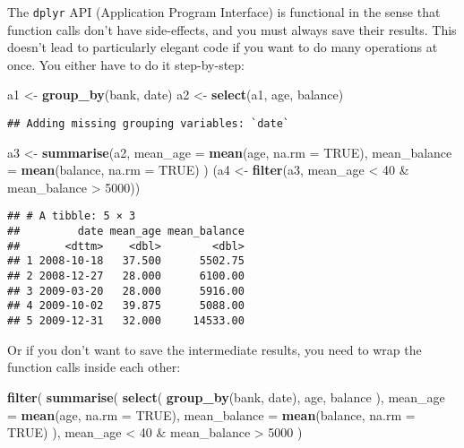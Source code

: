 \documentclass[]{book}
\newenvironment{Shaded}{\begin{snugshade}}{\end{snugshade}}
\newcommand{\KeywordTok}[1]{\textcolor[rgb]{0.13,0.29,0.53}{\textbf{{#1}}}}
\newcommand{\DataTypeTok}[1]{\textcolor[rgb]{0.13,0.29,0.53}{{#1}}}
\newcommand{\DecValTok}[1]{\textcolor[rgb]{0.00,0.00,0.81}{{#1}}}
\newcommand{\StringTok}[1]{\textcolor[rgb]{0.31,0.60,0.02}{{#1}}}
\newcommand{\OtherTok}[1]{\textcolor[rgb]{0.56,0.35,0.01}{{#1}}}
\newcommand{\NormalTok}[1]{{#1}}
\begin{document}
The \texttt{dplyr} API (Application Program Interface) is functional in
the sense that function calls don't have side-effects, and you must
always save their results. This doesn't lead to particularly elegant
code if you want to do many operations at once. You either have to do it
step-by-step:

\begin{Shaded}
\begin{Highlighting}[]
\NormalTok{a1 <-}\StringTok{ }\KeywordTok{group_by}\NormalTok{(bank, date)}
\NormalTok{a2 <-}\StringTok{ }\KeywordTok{select}\NormalTok{(a1, age, balance)}
\end{Highlighting}
\end{Shaded}

\begin{verbatim}
## Adding missing grouping variables: `date`
\end{verbatim}

\begin{Shaded}
\begin{Highlighting}[]
\NormalTok{a3 <-}\StringTok{ }\KeywordTok{summarise}\NormalTok{(a2,}
                \DataTypeTok{mean_age =} \KeywordTok{mean}\NormalTok{(age, }\DataTypeTok{na.rm =} \OtherTok{TRUE}\NormalTok{),}
                \DataTypeTok{mean_balance =} \KeywordTok{mean}\NormalTok{(balance, }\DataTypeTok{na.rm =} \OtherTok{TRUE}\NormalTok{)}
                \NormalTok{)}
\NormalTok{(a4 <-}\StringTok{ }\KeywordTok{filter}\NormalTok{(a3, mean_age <}\StringTok{ }\DecValTok{40} \NormalTok{&}\StringTok{ }\NormalTok{mean_balance >}\StringTok{ }\DecValTok{5000}\NormalTok{))}
\end{Highlighting}
\end{Shaded}

\begin{verbatim}
## # A tibble: 5 × 3
##         date mean_age mean_balance
##       <dttm>    <dbl>        <dbl>
## 1 2008-10-18   37.500      5502.75
## 2 2008-12-27   28.000      6100.00
## 3 2009-03-20   28.000      5916.00
## 4 2009-10-02   39.875      5088.00
## 5 2009-12-31   32.000     14533.00
\end{verbatim}

Or if you don't want to save the intermediate results, you need to wrap
the function calls inside each other:

\begin{Shaded}
\begin{Highlighting}[]
\KeywordTok{filter}\NormalTok{(}
  \KeywordTok{summarise}\NormalTok{(}
    \KeywordTok{select}\NormalTok{(}
      \KeywordTok{group_by}\NormalTok{(bank, date), age, balance}
    \NormalTok{),}
    \DataTypeTok{mean_age =} \KeywordTok{mean}\NormalTok{(age, }\DataTypeTok{na.rm =} \OtherTok{TRUE}\NormalTok{),}
    \DataTypeTok{mean_balance =} \KeywordTok{mean}\NormalTok{(balance, }\DataTypeTok{na.rm =} \OtherTok{TRUE}\NormalTok{)}
  \NormalTok{),}
  \NormalTok{mean_age <}\StringTok{ }\DecValTok{40} \NormalTok{&}\StringTok{ }\NormalTok{mean_balance >}\StringTok{ }\DecValTok{5000}
\NormalTok{)}
\end{Highlighting}
\end{Shaded}
\end{document}
